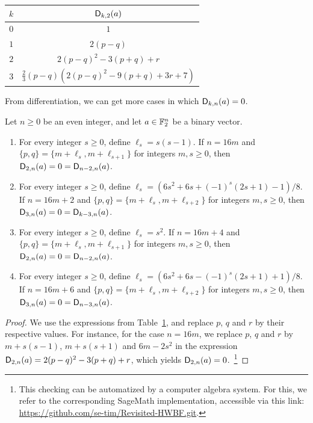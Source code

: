 \documentclass{llncs}
\begin{document}
\begin{table}[ht]
	\small
	\centering
	\begin{tabular}{|c|c|}
		\hline
		$k$ & $\Dnka 2ka$\\ \hline
		$0$&$1$\\
		$1$&$2(p-q)$\\ 
		$2$&$2(p-q)^2-3(p+q)+r$\\
		$3$&$\frac 23(p-q)\left(2(p-q)^2-9(p+q)+3r+7\right)$\\ \hline
	\end{tabular}
	\label{tab:Dnka_small_k}
\end{table}

From differentiation, we can get more cases in which $\Dnka nka=0$.

\begin{proposition}
    Let $n\geq 0$ be an even integer, and let $a\in\F_2^n$ be a binary vector.
    \begin{enumerate}
        \item For every integer $s\geq0$, define $\ell_s=s(s-1)$. If $n=16m$ and $\{p,q\}=\{m+\ell_s,m+\ell_{s+1}\}$ for integers $m,s\geq 0$, then $\Dnka n2a=0=\Dnka n{n-2}a$.
        \item For every integer $s\geq 0$, define $\ell_s=\left(6s^2+6s+(-1)^s(2s+1)-1\right)/8$. If $n=16m+2$ and $\{p,q\}=\{m+\ell_s,m+\ell_{s+2}\}$ for integers $m,s\geq 0$, then $\Dnka n3a=0=\Dnka n{k-3}a$.
        \item For every integer $s\geq 0$, define $\ell_s=s^2$. If $n=16m+4$ and $\{p,q\}=\{m+\ell_s,m+\ell_{s+1}\}$ for integers $m,s\geq 0$, then $\Dnka n2a=0=\Dnka n{n-2}a$.
        \item For every integer $s\geq 0$, define $\ell_s=\left(6s^2+6s-(-1)^s(2s+1)+1\right)/8$. If $n=16m+6$ and $\{p,q\}=\{m+\ell_s,m+\ell_{s+2}\}$ for integers $m,s\geq 0$, then $\Dnka n3a=0=\Dnka n{n-3}a$.
    \end{enumerate}
\end{proposition}

\begin{proof}
	We use the expressions from Table~\ref{tab:Dnka_small_k}, and replace $p$, $q$ and $r$ by their respective values. 
	For instance, for the case $n=16m$, we replace $p$, $q$ and $r$ by $m+s(s-1)$, $m+s(s+1)$ and $6m-2s^2$ in the expression $\Dnka n2a=2(p-q)^2-3(p+q)+r$, which yields $\Dnka n2a=0$.~\footnote{This checking can be automatized by a computer algebra system.
	\ifnum{}
		For this, we refer to the corresponding \textsf{SageMath} implementation, accessible via this link: \url{https://github.com/se-tim/Revisited-HWBF.git}.
	\fi}
\end{proof}
\end{document}
